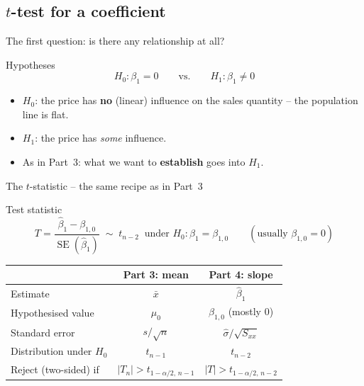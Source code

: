 \documentclass[aspectratio=169,11pt]{beamer}
\begin{document}
\subsection{\texorpdfstring{$t$}{t}-test for a coefficient}

\begin{frame}{The first question: is there any relationship at all?}
  \begin{block}{Hypotheses}
    \[
      H_0: \beta_1 = 0 \qquad\text{vs.}\qquad H_1: \beta_1 \ne 0
    \]
  \end{block}
  \begin{itemize}\setlength{\itemsep}{3pt}
    \item $H_0$: the price has \textbf{no} (linear) influence on the sales
          quantity -- the population line is flat.
    \item $H_1$: the price has \emph{some} influence.
    \item As in Part~3: what we want to \textbf{establish} goes into $H_1$.
  \end{itemize}
\end{frame}

\begin{frame}{The $t$-statistic -- the same recipe as in Part~3}
  \begin{block}{Test statistic}
    \[
      T=\frac{\hat\beta_1-\beta_{1,0}}{\operatorname{SE}(\hat\beta_1)}
      \;\sim\; t_{n-2}\ \text{ under } H_0:\beta_1=\beta_{1,0}
      \qquad(\text{usually } \beta_{1,0}=0)
    \]
  \end{block}
  \begin{center}
    \renewcommand{\arraystretch}{1.2}
    \begin{tabular}{lcc}
      \toprule
      & \textbf{Part 3: mean} & \textbf{Part 4: slope}\\
      \midrule
      Estimate & $\bar x$ & $\hat\beta_1$\\
      Hypothesised value & $\mu_0$ & $\beta_{1,0}$ (mostly $0$)\\
      Standard error & $s/\sqrt n$ & $\hat\sigma/\sqrt{S_{xx}}$\\
      Distribution under $H_0$ & $t_{n-1}$ & $t_{n-2}$\\
      Reject (two-sided) if & $|T_n|>t_{1-\alpha/2,\,n-1}$ & $|T|>t_{1-\alpha/2,\,n-2}$\\
      \bottomrule
    \end{tabular}
  \end{center}
\end{frame}
\end{document}
